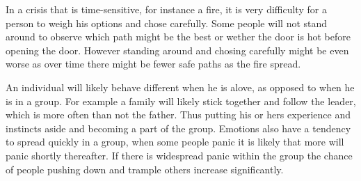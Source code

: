 In a crisis that is time-sensitive, for instance a fire, it is very difficulty for a person to weigh his options and 
chose carefully. Some people will not stand around to observe which path might be the best or wether the 
door is hot before opening the door. However standing around and chosing carefully might be even worse as 
over time there might be fewer safe paths as the fire spread.  

An individual will likely behave different when he is alove, as opposed to when he is in a group. For example
 a family will likely stick together and follow the leader, which is more often than not the father. Thus putting 
his or hers experience and instincts aside and becoming a part of the group. Emotions also have a tendency
 to spread quickly in a group, when some people panic it is likely that more will panic shortly thereafter. If 
there is widespread panic within the group the chance of people pushing down and trample others increase 
significantly.